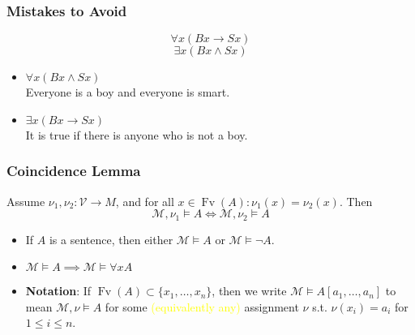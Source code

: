 \documentclass[UTF8,11pt,colorlinks,compress,openany]{beamer}%
\begin{document}
\begin{frame}\frametitle{Mistakes to Avoid}
\[\forall x(Bx\to Sx)\]
\[\exists x(Bx\wedge Sx)\]
\begin{itemize}
	\item $\forall x(Bx\wedge Sx)$\\
	Everyone is a boy and everyone is smart.
	\item $\exists x(Bx\to Sx)$\\
	It is true if there is anyone who is not a boy.
\end{itemize}
\end{frame}

\begin{frame}\frametitle{Coincidence Lemma}
	\begin{lemma}
		Assume $\nu_1,\nu_2: \mathcal{V}\to M$, and for all $x\in \operatorname{Fv}(A): \nu_1(x)=\nu_2(x)$. Then
		\[\mathcal{M},\nu_1\vDash A\iff\mathcal{M},\nu_2\vDash A\]
	\end{lemma}
	\begin{itemize}
		\item If $A$ is a sentence, then either $\mathcal{M}\vDash A$ or $\mathcal{M}\vDash\neg A$.
		\item $\mathcal{M}\vDash A\implies\mathcal{M}\vDash\forall x A$
		\item \textbf{Notation}: If $\operatorname{Fv}(A)\subset\{x_1,\dots,x_n\}$, then we write $\mathcal{M}\vDash A[a_1,\dots,a_n]$ to mean $\mathcal{M},\nu\vDash A$ for some \textcolor{yellow}{(equivalently any)} assignment $\nu$ s.t. $\nu(x_i)=a_i$ for $1\leq i\leq n$.
	\end{itemize}
\end{frame}
\end{document}
